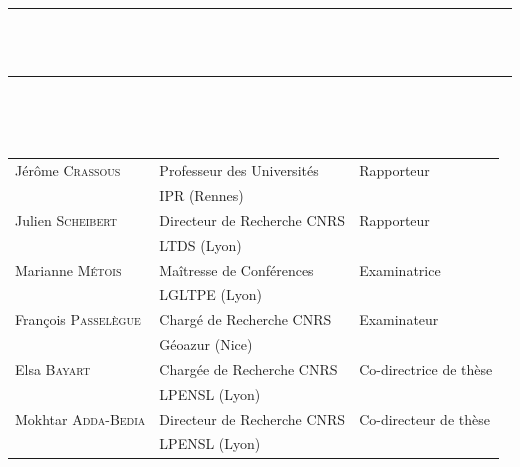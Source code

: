 \begin{titlepage}
	\vspace{10pt}
	
	\begin{center}
		\noindent\rule{16cm}{0.25pt}\\
		\vspace{10pt}
		{\THETITLE } \\
		\noindent\rule{16cm}{0.25pt}\\
	\end{center}
	\vfill 
	
	
	 \\
	
	\noindent \begin{tabular}{p{}p{}p{}}
		Jérôme \textsc {Crassous} & 
			Professeur des Universités & 
			Rapporteur
		\\
			&
			IPR (Rennes)  & \\
		Julien \textsc {Scheibert} & Directeur de Recherche CNRS & Rapporteur\\
		& LTDS (Lyon) & \\
		Marianne \textsc {Métois} &  Maîtresse de Conférences & Examinatrice \\
		& LGLTPE (Lyon)& \\
		François \textsc {Passelègue} & Chargé de Recherche CNRS & Examinateur\\
		& Géoazur (Nice) & \\
		Elsa \textsc {Bayart} & Chargée de Recherche CNRS & Co-directrice de thèse\\
		& LPENSL (Lyon) &\\
		Mokhtar \textsc {Adda-Bedia} & Directeur de Recherche CNRS & Co-directeur de thèse\\
		& LPENSL (Lyon) &
	\end{tabular}
	
\end{titlepage}

\restoregeometry 
